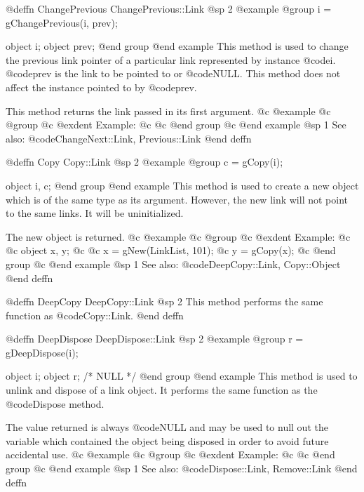 @deffn {ChangePrevious} ChangePrevious::Link
@sp 2
@example
@group
i = gChangePrevious(i, prev);

object  i;
object  prev;
@end group
@end example
This method is used to change the previous link pointer of a particular
link represented by instance @code{i}.  @code{prev} is the link to be
pointed to or @code{NULL}.  This method does not affect the instance
pointed to by @code{prev}.

This method returns the link passed in its first argument.
@c @example
@c @group
@c @exdent Example:
@c 
@c @end group
@c @end example
@sp 1
See also:  @code{ChangeNext::Link, Previous::Link}
@end deffn







@deffn {Copy} Copy::Link
@sp 2
@example
@group
c = gCopy(i);

object  i, c;
@end group
@end example
This method is used to create a new object which is of the same type as
its argument.  However, the new link will not point to the same links.
It will be uninitialized.

The new object is returned.
@c @example
@c @group
@c @exdent Example:
@c 
@c object  x, y;
@c 
@c x = gNew(LinkList, 101);
@c y = gCopy(x);
@c @end group
@c @end example
@sp 1
See also:  @code{DeepCopy::Link, Copy::Object}
@end deffn










@deffn {DeepCopy} DeepCopy::Link
@sp 2
This method performs the same function as @code{Copy::Link}.
@end deffn











@deffn {DeepDispose} DeepDispose::Link
@sp 2
@example
@group
r = gDeepDispose(i);

object  i;
object  r;     /*  NULL  */
@end group
@end example
This method is used to unlink and dispose of a link object.
It performs the same function as the @code{Dispose} method.

The value returned is always @code{NULL} and may be used to null out
the variable which contained the object being disposed in order to
avoid future accidental use.
@c @example
@c @group
@c @exdent Example:
@c 
@c @end group
@c @end example
@sp 1
See also:  @code{Dispose::Link, Remove::Link}
@end deffn










